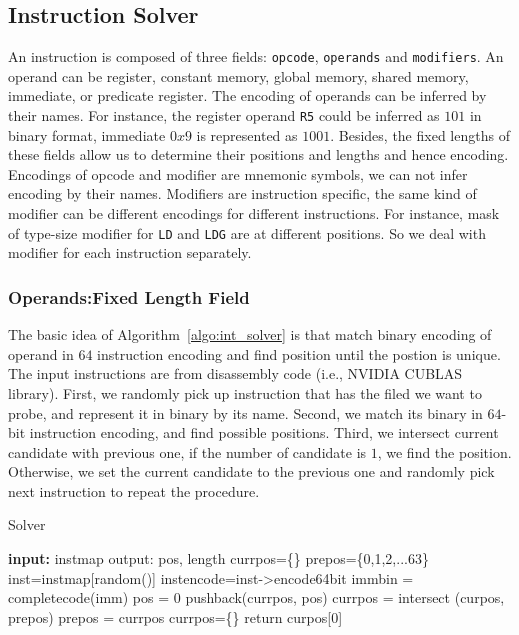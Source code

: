 \subsection{Instruction Solver}
An instruction is composed of three fields: {\tt opcode}, {\tt operands} and {\tt modifiers}. An operand can be register, constant memory, global memory, shared memory, immediate, or predicate register.
The encoding of operands can be inferred by their names. For instance, the register operand {\tt R5} could be
inferred as $101$ in binary format, immediate $0x9$ is represented as $1001$. Besides, the fixed lengths of these fields allow us to determine their positions and lengths and hence encoding. Encodings of opcode and modifier are mnemonic symbols, we can not infer encoding by their names. Modifiers are instruction specific, the same kind of modifier can be different encodings for different instructions. For instance, mask of type-size
modifier for {\tt LD} and {\tt LDG} are at different positions. So we deal with modifier for each instruction separately.

\subsubsection{Operands:Fixed Length Field}

The basic idea of Algorithm~\ref{algo:int_solver} is that match binary encoding of operand in $64$ instruction encoding and find
position until the postion is unique. The input instructions are from disassembly code (i.e., NVIDIA CUBLAS library).
First, we randomly pick up instruction that has the filed we want to probe, and represent it in binary by its name. Second, we match its binary in $64$-bit instruction encoding, and find possible positions. Third, we intersect current candidate with previous one, if the number of candidate is $1$, we find the position. Otherwise, we set the current candidate to the previous one and randomly pick next instruction to repeat the procedure.

\begin{algorithm}
      \caption{Solver}
      \label{algo:int_solver}
  \begin{algorithmic}[1]
	  \State \textbf{input:} instmap
      \State output: pos, length
      \State currpos=\{\}
      \State prepos=\{0,1,2,...63\}
      \State inst=instmap[random()]
      \State instencode=inst->encode64bit
      \State immbin = completecode(imm)
      \State pos = 0
      \State pushback(currpos, pos)
      \EndIf
      \EndWhile
      \State currpos = intersect (curpos, prepos)
      \State prepos = currpos
      \State currpos=\{\}
      \EndIf
      \EndWhile
      \State return curpos[0]
  \end{algorithmic}
\end{algorithm}


